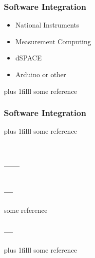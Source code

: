 \documentclass[fleqn]{beamer} %
\newcommand{\sectiontitleIII}{Software Integration}
\newcommand{\sectiontitleIV}{---}
\newcommand{\btVFill}{\vskip0pt plus 1filll}
\begin{document}
\begin{frame}[label=sectionIII] \small
\frametitle{\sectiontitleIII}
\bigskip

\begin{itemize}
	\item National Instruments \vspace{6mm}\\
	
	\item Measurement Computing  \vspace{6mm}\\
	
	\item dSPACE  \vspace{6mm}\\
	
	\item Arduino or other 
	
\end{itemize}


\btVFill
\tiny{some reference}		

\end{frame}

\begin{frame}[label=sectionIII] \small
\frametitle{\sectiontitleIII}
\bigskip


\btVFill
\tiny{some reference}	
\end{frame}

\section{\sectiontitleIV}	

\begin{frame}[label=sectionIV] \small
\frametitle{\sectiontitleIV}
\bigskip

\tiny{some reference}	
\end{frame}

\begin{frame}[label=sectionIV] \small
\frametitle{\sectiontitleIV}
\bigskip



\btVFill
\tiny{some reference}	
\end{frame}
\end{document}
